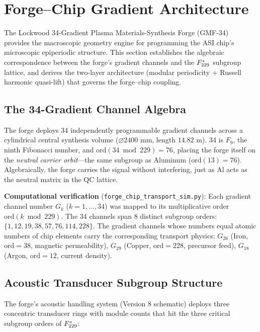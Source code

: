 \section{Forge--Chip Gradient Architecture}\label{sec:forge}

The Lockwood 34-Gradient Plasma Materials-Synthesis Forge (GMF-34)~\cite{lockwood_gmf34} provides the macroscopic geometry engine for programming the ASI chip's microscopic epiperiodic structure. This section establishes the algebraic correspondence between the forge's gradient channels and the $F_{229}^*$ subgroup lattice, and derives the two-layer architecture (modular periodicity + Russell harmonic quasi-lift) that governs the forge--chip coupling.

\subsection{The 34-Gradient Channel Algebra}

The forge deploys 34 independently programmable gradient channels across a cylindrical central synthesis volume ($\varnothing 2400$ mm, length $14.82$ m). 34 is $F_9$, the ninth Fibonacci number, and $\mathrm{ord}(34 \bmod 229) = 76$, placing the forge itself on the \emph{neutral carrier orbit}---the same subgroup as Aluminum ($\mathrm{ord}(13) = 76$). Algebraically, the forge carries the signal without interfering, just as Al acts as the neutral matrix in the QC lattice.

\textbf{Computational verification} (\texttt{forge\_chip\_transport\_sim.py}): Each gradient channel number $G_k$ ($k = 1, \dots, 34$) was mapped to its multiplicative order $\mathrm{ord}(k \bmod 229)$. The 34 channels span 8 distinct subgroup orders: $\{1, 12, 19, 38, 57, 76, 114, 228\}$. The gradient channels whose numbers equal atomic numbers of chip elements carry the corresponding transport physics: $G_{26}$ (Iron, $\mathrm{ord} = 38$, magnetic permeability), $G_{29}$ (Copper, $\mathrm{ord} = 228$, precursor feed), $G_{18}$ (Argon, $\mathrm{ord} = 12$, current density).

\subsection{Acoustic Transducer Subgroup Structure}

The forge's acoustic handling system (Version 8 schematic) deploys three concentric transducer rings with module counts that hit the three critical subgroup orders of $F_{229}^*$:

